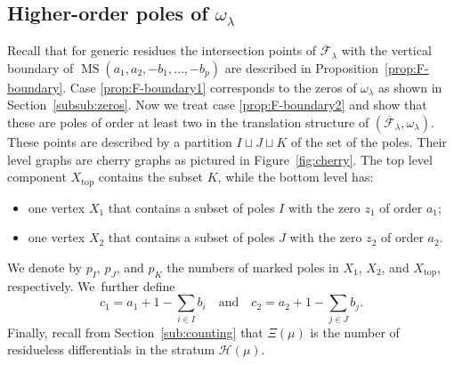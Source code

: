 \documentclass[11pt]{article}
\newcommand\calH{{\mathcal H}}
\DeclareMathOperator\MS{MS}
\theoremstyle{definition}
\begin{document}
\subsection{Higher-order poles of $\omega_{\lambda}$}\label{subsub:HigherPoles}

Recall that for generic residues the intersection points of $\overline{\mathcal{F}}_{\lambda}$ with the vertical boundary of $\MS(a_{1},a_{2},-b_{1},\dots,-b_{p})$ are described in Proposition~\ref{prop:F-boundary}. Case \eqref{prop:F-boundary1} corresponds to the zeros of $\omega_{\lambda}$ as shown in Section~\ref{subsub:zeros}. Now we treat case \eqref{prop:F-boundary2} and show that these are poles of order at least two in the translation structure of $(\overline{\mathcal{F}}_{\lambda},\omega_{\lambda})$. These points are described by a partition $I \sqcup J \sqcup K$ of the set of the poles. Their level graphs are cherry graphs as pictured in Figure~\ref{fig:cherry}. The top level component $X_\mathrm{top}$ contains the subset $K$, while the bottom level has:
\begin{itemize}
\item one vertex $X_{1}$ that contains a subset of poles $I$ with the zero $z_1$ of order $a_{1}$;
\item one vertex $X_{2}$ that contains a subset of poles $J$ with the zero $z_{2}$ of order $a_{2}$.
\end{itemize}
We denote by $p_{I}$, $p_{J}$, and $p_{K}$ the numbers of marked poles in $X_{1}$, $X_{2}$, and $X_\mathrm{top}$, respectively. We~further define
\begin{equation}\label{eq:prongs}
c_{1}=a_{1}+1-\sum_{i \in I} b_{i} \quad \text{and} \quad c_{2}=a_{2}+1-\sum_{j \in J} b_{j}.
\end{equation}
Finally, recall from Section~\ref{sub:counting} that $\Xi(\mu)$ is the number of residueless differentials in the stratum $\calH(\mu)$.
\end{document}
